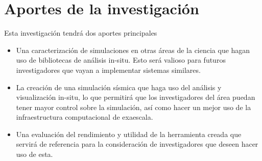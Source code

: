 
\section{Aportes de la investigación}
Esta investigación tendrá dos aportes principales
\begin{itemize}
  \item Una caracterización de simulaciones en otras áreas de la ciencia que hagan uso de bibliotecas de análisis in-situ. Esto será valioso para futuros investigadores que vayan a implementar sistemas similares. 
  \item La creación de una simulación sísmica que haga uso del análisis y visualización in-situ, lo que permitirá que los investigadores del área puedan tener mayor control sobre la simulación, así como hacer un mejor uso de la infraestructura computacional de exaescala. 
  \item Una evaluación del rendimiento y utilidad de la herramienta creada que servirá de referencia para la consideración de investigadores que deseen hacer uso de esta. 
  
\end{itemize}


